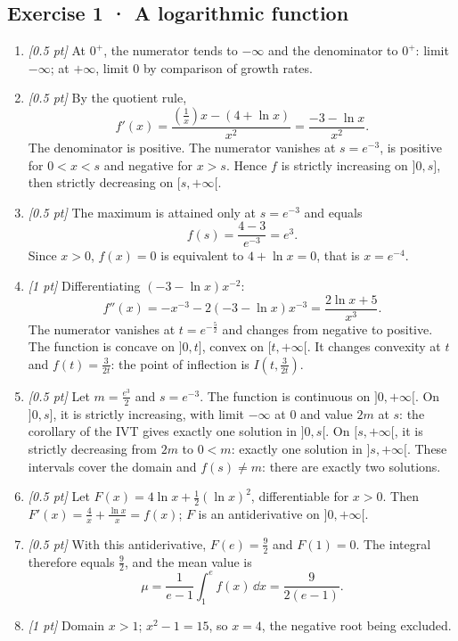 \subsection*{Exercise 1 · A logarithmic function}\begin{enumerate}

\item \textit{[0.5 pt]} At $0^+$, the numerator tends to $-\infty$ and the denominator to $0^+$: limit $-\infty$; at $+\infty$, limit $0$ by comparison of growth rates.

\item \textit{[0.5 pt]} By the quotient rule,
\[f'(x)=\frac{(\frac{1}{x})x-(4+\ln x)}{x^2}=\frac{-3-\ln x}{x^2}.\]
The denominator is positive. The numerator vanishes at $s=e^{-3}$, is positive for $0<x<s$ and negative for $x>s$. Hence $f$ is strictly increasing on $]0,s]$, then strictly decreasing on $[s,+\infty[$.

\item \textit{[0.5 pt]} The maximum is attained only at $s=e^{-3}$ and equals
\[f(s)=\frac{4- 3}{e^{-3}}=e^{3}.\]
Since $x>0$, $f(x)=0$ is equivalent to $4+\ln x=0$, that is $x=e^{-4}$.

\item \textit{[1 pt]} Differentiating $(-3-\ln x)x^{-2}$:
\[f''(x)=-x^{-3}-2(-3-\ln x)x^{-3}=\frac{2\ln x+5}{x^3}.\]
The numerator vanishes at $t=e^{-\frac{5}{2}}$ and changes from negative to positive. The function is concave on $]0,t]$, convex on $[t,+\infty[$. It changes convexity at $t$ and $f(t)=\frac{3}{2t}$: the point of inflection is $I(t,\frac{3}{2t})$.

\item \textit{[0.5 pt]} Let $m=\frac{e^{3}}{2}$ and $s=e^{-3}$. The function is continuous on $]0,+\infty[$. On $]0,s]$, it is strictly increasing, with limit $-\infty$ at $0$ and value $2m$ at $s$: the corollary of the IVT gives exactly one solution in $]0,s[$. On $[s,+\infty[$, it is strictly decreasing from $2m$ to $0<m$: exactly one solution in $]s,+\infty[$. These intervals cover the domain and $f(s)\ne m$: there are exactly two solutions.

\item \textit{[0.5 pt]} Let $F(x)=4\ln x+\frac12(\ln x)^2$, differentiable for $x>0$. Then $F'(x)=\frac{4}{x}+\frac{\ln x}{x}=f(x)$; $F$ is an antiderivative on $]0,+\infty[$.

\item \textit{[0.5 pt]} With this antiderivative, $F(e)=\frac{9}{2}$ and $F(1)=0$. The integral therefore equals $\frac{9}{2}$, and the mean value is
\[\mu=\frac{1}{e-1}\int_1^e f(x)\,\dd x=\frac{9}{2(e-1)}.\]

\item \textit{[1 pt]} Domain $x>1$; $x^2-1=15$, so $x=4$, the negative root being excluded.

\end{enumerate}

